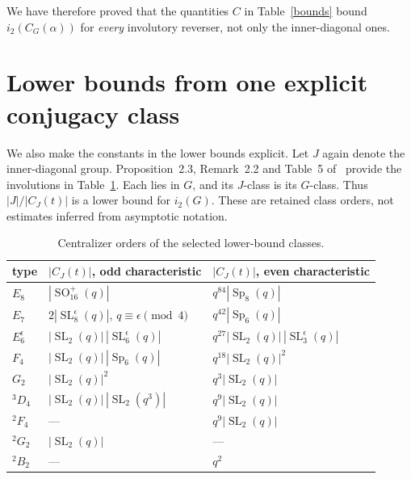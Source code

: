 \documentclass[10pt,a4paper]{article}
\newcommand{\Sp}{\operatorname{Sp}}\newcommand{\SL}{\operatorname{SL}}
\newcommand{\SO}{\operatorname{SO}}\newcommand{\GL}{\operatorname{GL}}
\begin{document}
We have therefore proved that the quantities $C$ in Table~\ref{bounds}
bound $i_2(C_G(\alpha))$ for \emph{every} involutory reverser, not only
the inner-diagonal ones.

\section{Lower bounds from one explicit conjugacy class}

We also make the constants in the lower bounds explicit. Let $J$ again
denote the inner-diagonal group. Proposition~2.3, Remark~2.2 and Table~5
of~\cite{BT} provide the involutions in Table~\ref{classes}. Each lies in
$G$, and its $J$-class is its $G$-class. Thus $|J|/|C_J(t)|$ is a lower
bound for $i_2(G)$. These are retained class orders, not estimates inferred
from asymptotic notation.

\begin{table}[ht]\centering\small
\begin{tabular}{lll}
\toprule
type&$|C_J(t)|$, odd characteristic&$|C_J(t)|$, even characteristic\\\midrule
$E_8$&$|\SO_{16}^+(q)|$&$q^{84}|\Sp_8(q)|$\\
$E_7$&$2|\SL_8^\epsilon(q)|$, $q\equiv\epsilon\pmod4$
 &$q^{42}|\Sp_6(q)|$\\
$E_6^\epsilon$&$|\SL_2(q)|\,|\SL_6^\epsilon(q)|$
 &$q^{27}|\SL_2(q)|\,|\SL_3^\epsilon(q)|$\\
$F_4$&$|\SL_2(q)|\,|\Sp_6(q)|$&$q^{18}|\SL_2(q)|^2$\\
$G_2$&$|\SL_2(q)|^2$&$q^3|\SL_2(q)|$\\
$ {}^3D_4$&$|\SL_2(q)|\,|\SL_2(q^3)|$&$q^9|\SL_2(q)|$\\
$ {}^2F_4$&---&$q^9|\SL_2(q)|$\\
$ {}^2G_2$&$|\SL_2(q)|$&---\\
$ {}^2B_2$&---&$q^2$\\\bottomrule
\end{tabular}
\caption{Centralizer orders of the selected lower-bound classes.}
\label{classes}
\end{table}
\end{document}
